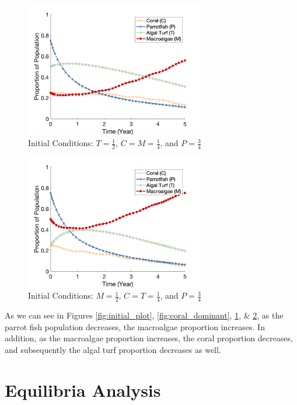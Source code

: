 \documentclass[12pt]{article}
\begin{document}
\begin{figure}[H]
    \centering
    \includegraphics[width=0.7\textwidth]{Latex/Figures/Graphs/0.25C_0.5T_0.25M.png}
    \caption{Initial Conditions: $T = \frac{1}{2}$, $C = M = \frac{1}{4}$, and $P = \frac{3}{4}$}
    \label{fig:turf_dominant}
\end{figure}
\begin{figure}[H]
    \centering
    \includegraphics[width=0.7\textwidth]{Latex/Figures/Graphs/0.25C_0.25T_0.5M.png}
    \caption{Initial Conditions: $M = \frac{1}{2}$, $C = T = \frac{1}{4}$, and $P = \frac{3}{4}$}
    \label{fig:macroalgae_dominant}
\end{figure}
As we can see in Figures \ref{fig:initial_plot}, \ref{fig:coral_dominant}, \ref{fig:turf_dominant}, \& \ref{fig:macroalgae_dominant}, as the parrot fish population decreases, the macroalgae proportion increases. In addition, as the macroalgae proportion increases, the coral proportion decreases, and subsequently the algal turf proportion decreases as well.\\

\section{Equilibria Analysis}
\end{document}
